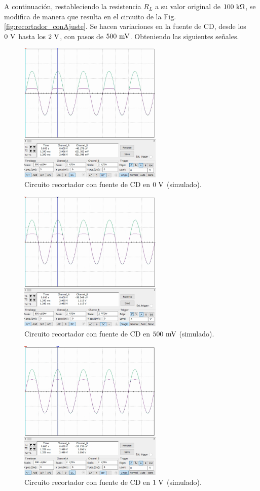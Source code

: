 \documentclass[journal]{IEEEtran}
\begin{document}
A continuación, restableciendo la resistencia $R_L$ a su valor original de $100~\textnormal{k}\Omega$, se modifica de manera que resulta en el circuito de la Fig. \ref{fig:recortador_conAjuste}.
Se hacen variaciones en la fuente de CD, desde los $0~\textnormal{V}$ hasta los $2~\textnormal{V}$, con pasos de $500~\textnormal{mV}$. Obteniendo las siguientes señales.

\begin{figure}[H]
        \centering
        \includegraphics[width=2.7in]{SignalSimulated_05.png}
        \caption{Circuito recortador con fuente de CD en $0~\textnormal{V}$ (simulado).}
        \label{fig:SignalSimulated_05}
\end{figure}
\begin{figure}[H]
        \centering
        \includegraphics[width=2.7in]{SignalSimulated_06.png}
        \caption{Circuito recortador con fuente de CD en $500~\textnormal{mV}$ (simulado).}
        \label{fig:SignalSimulated_06}
\end{figure}
\begin{figure}[H]
        \centering
        \includegraphics[width=2.7in]{SignalSimulated_07.png}
        \caption{Circuito recortador con fuente de CD en $1~\textnormal{V}$ (simulado).}
        \label{fig:SignalSimulated_07}
\end{figure}
\end{document}
